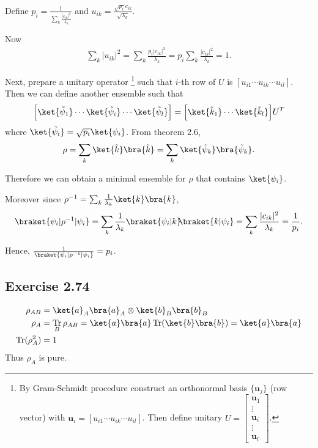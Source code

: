 \documentclass[a4paper,12pt]{article}
\DeclareMathOperator{\Tr}{Tr}
\begin{document}
Define $\displaystyle p_i = \frac{1}{\sum_k \frac{|c_{ik}|^2}{\lambda_k} }$ and $\displaystyle u_{ik} = \frac{\sqrt{p_i} c_{ik}}{\sqrt{\lambda_k}}$.

Now
\begin{align*}
	\sum_k |u_{ik}|^2 = \sum_k \frac{p_i | c_{ik} |^2 }{\lambda_k} = p_i \sum_k \frac{| c_{ik} |^2 }{\lambda_k} = 1.
\end{align*}

Next, prepare a unitary operator
\footnote{By Gram-Schmidt procedure construct an orthonormal basis $\{\boldsymbol{u}_j\}$ (row vector) with $\boldsymbol{u}_i = [u_{i1} \cdots u_{ik} \cdots u_{il}]$. Then define unitary $U = \begin{bmatrix}
    \boldsymbol{u}_1 \\ 
    \vdots \\ 
    \boldsymbol{u}_i \\ 
    \vdots \\ 
    \boldsymbol{u}_l
    \end{bmatrix}$.}
such that $i$-th row of $U$ is $[u_{i1} \cdots u_{ik} \cdots u_{il}]$.
Then we can define another ensemble such that
\begin{align*}
	\Big[  \ket{\tilde{\psi}_1} \cdots  \ket{\tilde{\psi}_i} \cdots \ket{\tilde{\psi}_l}\Big] = \Big[ \ket{\tilde{k}_1} \cdots \ket{\tilde{k}_l} \Big] U^T
\end{align*}
where $\ket{\tilde{\psi_i}} = \sqrt{p_i} \ket{\psi_i}$.
From theorem 2.6,
\begin{align*}
	\rho = \sum_k \ket{\tilde{k}}\bra{\tilde{k}} = \sum_k \ket{\tilde{\psi}_k}\bra{\tilde{\psi}_k}.
\end{align*}

Therefore we can obtain a minimal ensemble for $\rho$ that contains $\ket{\psi_i}$.

Moreover since $\rho^{-1} = \sum_k \frac{1}{\lambda_k} \ket{k}\bra{k}$,
\begin{align*}
	\braket{\psi_i | \rho^{-1} | \psi_i} = \sum_k \frac{1}{\lambda_k} \braket{\psi_i | k} \hspace{-1mm} \braket{k | \psi_i} = \sum_k \frac{|c_{ik}|^2}{\lambda_k} = \frac{1}{p_i}.
\end{align*}

Hence, $ \frac{1}{\braket{\psi_i | \rho^{-1} | \psi_i}} = p_i $.


\subsection*{Exercise 2.74}
\begin{align*}
	\rho_{AB} &= \ket{a}_A\bra{a}_A \otimes \ket{b}_B\bra{b}_B\\
	\rho_A &= \Tr_{B} \rho_{AB} = \ket{a}\bra{a} \Tr (\ket{b}\bra{b}) = \ket{a}\bra{a}\\
	\Tr (\rho_A^2) &= 1
\end{align*}
Thus $\rho_A$ is pure.
\end{document}
